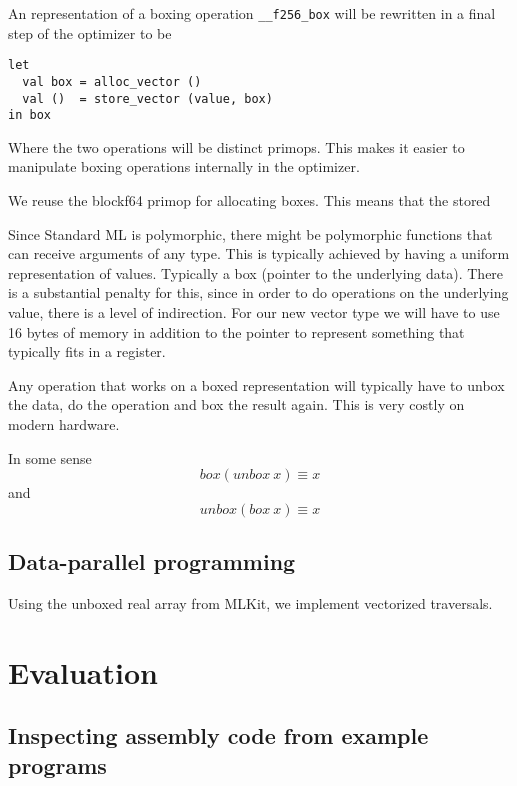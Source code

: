 \documentclass{article}
\begin{document}
An representation of a boxing operation \verb!__f256_box! will be rewritten in a final step of the optimizer to be
\begin{lstlisting}
let
  val box = alloc_vector ()
  val ()  = store_vector (value, box)
in box
\end{lstlisting}
Where the two operations will be distinct primops. This makes it easier to manipulate boxing operations internally in the optimizer.


We reuse the blockf64 primop for allocating boxes. This means that the stored 

Since Standard ML is polymorphic, there might be polymorphic functions that can receive arguments of any type. This is typically achieved by having a uniform representation of values. Typically a box (pointer to the underlying data). There is a substantial penalty for this, since in order to do operations on the underlying value, there is a level of indirection. For our new vector type we will have to use 16 bytes of memory in addition to the pointer to represent something that typically fits in a register.

Any operation that works on a boxed representation will typically have to unbox the data, do the operation and box the result again. This is very costly on modern hardware.

In some sense
\[
    box (unbox\ x) \equiv x
\]
and
\[
    unbox (box\ x) \equiv x
\]

\subsection{Data-parallel programming}

Using the unboxed real array from MLKit, we implement vectorized traversals.

\section{Evaluation}

\subsection{Inspecting assembly code from example programs}
\end{document}

